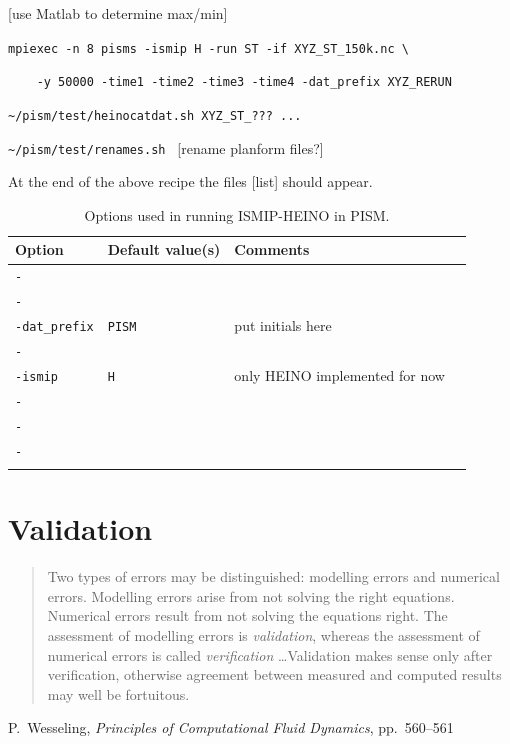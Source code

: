 \documentclass[12pt,final]{amsart}
\begin{document}
[use Matlab to determine max/min]

\verb|mpiexec -n 8 pisms -ismip H -run ST -if XYZ_ST_150k.nc \|

\verb|    -y 50000 -time1 -time2 -time3 -time4 -dat_prefix XYZ_RERUN|

\verb|~/pism/test/heinocatdat.sh XYZ_ST_??? ...|

\verb|~/pism/test/renames.sh | [rename planform files?]

\noindent At the end of the above recipe the files [list] should appear.

\begin{table}[h]
\caption{Options used in running ISMIP-HEINO in PISM.}\label{tab:heinooptions}
\small
\begin{tabular}{@{}llll}\hline
\textbf{Option} & \textbf{Default value(s)} & \textbf{Comments} \\ \hline
\verb|-| & & \\
\verb|-| & & \\
\verb|-dat_prefix| & \verb|PISM| & put initials here \\
\verb|-| & & \\
\verb|-ismip| & \verb|H| & only HEINO implemented for now \\
\verb|-| & & \\
\verb|-| & & \\
\verb|-| & & \\
\hline\normalsize
\end{tabular}\end{table}



\clearpage\newpage
\section{Validation}\label{sect:valid}

\bigskip
\begin{quote}  Two types of errors may be distinguished: modelling errors and numerical errors.  Modelling errors arise from not solving the right equations.  Numerical errors result from not solving the equations right.  The assessment of modelling errors is \emph{validation}, whereas the assessment of numerical errors is called \emph{verification} \dots  Validation makes sense only after verification, otherwise agreement between measured and computed results may well be fortuitous.
\end{quote}
\hfill P.~Wesseling, \emph{Principles of Computational Fluid Dynamics}, pp.~560--561 \cite{Wesseling}
\bigskip
\end{document}
